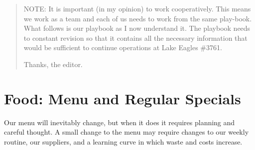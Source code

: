 \documentclass[a0,landscape]{a0poster}
\begin{document}
\vspace{1cm} %


\begin{multicols}{4} %


\color{Navy} %
%
\begin{abstract}
\textsc{NOTE:} It is important (in my opinion) to work cooperatively. This means we work as a team and each of us needs to work from the same play-book. What follows is our playbook as I now understand it. The playbook needs to constant revision so that it contains all the necessary information that would be sufficient to continue operations at Lake Eagles \#3761.

\vspace{.5cm}

\begin{flushright}
Thanks, the editor.
\end{flushright}

\end{abstract}


\color{SaddleBrown} %

\section*{Food: Menu and Regular Specials}

Our menu will inevitably change, but when it does it requires planning and careful thought. A small change to the menu may require changes to our weekly routine, our suppliers, and a learning curve in which waste and costs increase. 

\vspace{.5cm}


\end{multicols}
\end{document}

